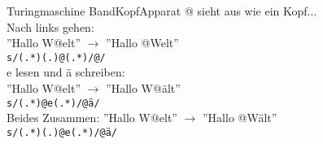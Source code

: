 \begin{frame}{Turingmaschine BandKopfApparat}
	@ sieht aus wie ein Kopf...\\
	Nach links gehen:\\
	''Hallo W@elt'' $\rightarrow$ ''Hallo @Welt''\\
	\texttt{s/(.*)(.)@(.*)/@/}\\
	e lesen und \"a schreiben:\\
	''Hallo W@elt'' $\rightarrow$ ''Hallo W@\"alt''\\
	\texttt{s/(.*)@e(.*)/@\"a/}\\
	Beides Zusammen:
	''Hallo W@elt'' $\rightarrow$ ''Hallo @W\"alt''\\
	\texttt{s/(.*)(.)@e(.*)/@\"a/}\\


\end{frame}

